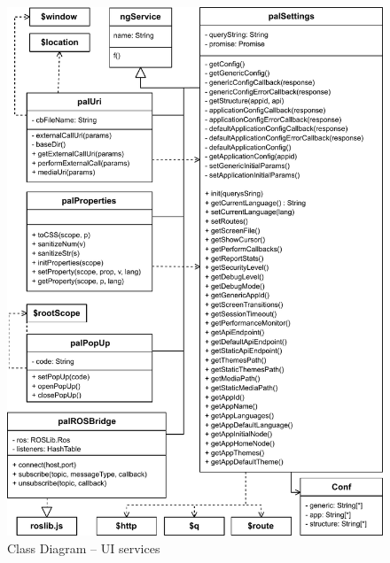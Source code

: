 \begin{figure}[htb]
    \centering
    \includegraphics{figures/design-class-services.pdf}
    \caption{Class Diagram -- UI services}
    \label{fig:class-services}
\end{figure}

